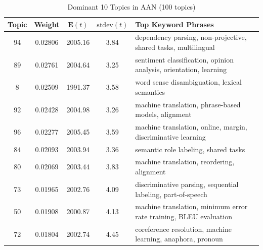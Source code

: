 \begin{table}
\caption{Dominant 10 Topics in AAN (100 topics)}\label{tab:aan}
\begin{center}
\begin{tabular}{|c|c|c|c|l|}
\hline %
Topic 	& Weight	 	&$\mathbf{E}(t)$ & $\mathrm{stdev}(t)$ &
  Top Keyword Phrases\\ \hline \hline
94		& 0.02806	& 2005.16		& 3.84	&
  dependency parsing, non-projective, shared tasks, multilingual\\
89		& 0.02761	& 2004.64		& 3.25	&
  sentiment classification, opinion analysis, orientation, learning \\
8		  & 0.02509	& 1991.37	  & 3.58	&
  word sense disambiguation, lexical semantics \\
92		& 0.02428	& 2004.98		& 3.26	&
  machine translation, phrase-based models, alignment \\
96		& 0.02277	& 2005.45		& 3.59	&
  machine translation, online, margin, discriminative learning \\
84		& 0.02093 & 2003.94		& 3.36	&
  semantic role labeling, shared tasks \\
80		& 0.02069	& 2003.44		& 3.83	&
  machine translation, reordering, alignment \\
73		& 0.01965	& 2002.76		& 4.09	&
  discriminative parsing, sequential labeling, part-of-speech \\
50		& 0.01908	& 2000.87		& 4.13	&
  machine translation, minimum error rate training, BLEU evaluation \\
72		& 0.01804	& 2002.74		& 4.45	&
  coreference resolution, machine learning, anaphora, pronoun \\ \hline\hline
\end{tabular}


\end{center}
\end{table}
